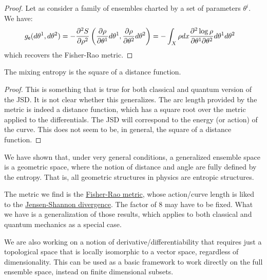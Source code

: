\begin{proof}
	Let as consider a family of ensembles charted by a set of parameters $\theta^i$. We have:
	\begin{equation}
		\begin{aligned}
			g_{\mathsf{e}}(d\theta^1, d\theta^2) &= - \frac{\partial^2 S}{\partial \rho^2}\left(\frac{\partial 
				\rho}{\partial \theta^1} d\theta^1, \frac{\partial 
				\rho}{\partial \theta^2} d\theta^2\right) = - \int_X \rho dx \frac{\partial^2 \log \rho}{\partial \theta^1 \partial \theta^2}d\theta^1 d\theta^2
		\end{aligned}
	\end{equation}
	which recovers the Fisher-Rao metric.
	
\end{proof}

\begin{conj}
	The mixing entropy is the square of a distance function.
\end{conj}

\begin{proof}
	This is something that is true for both classical and quantum version of the JSD. It is not clear whether this generalizes. The arc length provided by the metric is indeed a distance function, which has a square root over the metric applied to the differentials. The JSD will correspond to the energy (or action) of the curve. This does not seem to be, in general, the square of a distance function.
\end{proof}

\begin{remark}
	We have shown that, under very general conditions, a generalized ensemble space is a geometric space, where the notion of distance and angle are fully defined by the entropy. That is, all geometric structures in physics are entropic structures.

	The metric we find is the \href{https://en.wikipedia.org/wiki/Fisher_information_metric}{Fisher-Rao metric}, whose action/curve length is liked to the \href{https://en.wikipedia.org/wiki/Fisher_information_metric#Relation_to_the_Jensen%E2%80%93Shannon_divergence}{Jensen-Shannon divergence}. The factor of 8 may have to be fixed. What we have is a generalization of those results, which applies to both classical and quantum mechanics as a special case.

	We are also working on a notion of derivative/differentiability that requires just a topological space that is locally isomorphic to a vector space, regardless of dimensionality. This can be used as a basic framework to work directly on the full ensemble space, instead on finite dimensional subsets.
\end{remark}

